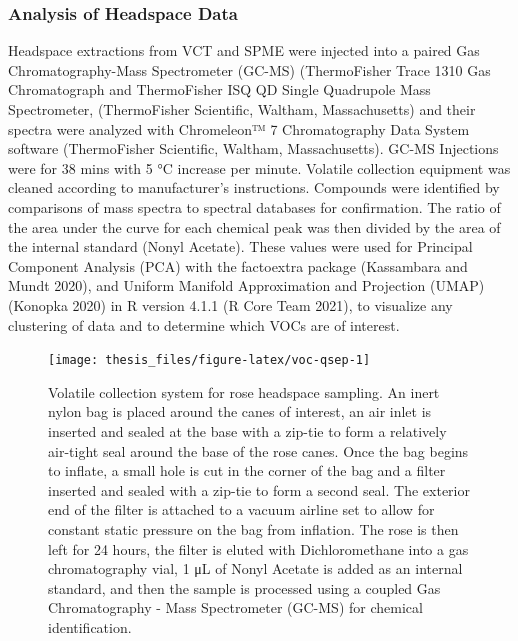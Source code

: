 \documentclass[12pt,final,CPage]{ufthesis}
\begin{document}
{  \hypertarget{mm-voc-analyze}{%
  \subsubsection{Analysis of Headspace Data}\label{mm-voc-analyze}}

  Headspace extractions from VCT and SPME were injected into a paired Gas Chromatography-Mass Spectrometer (GC-MS) (ThermoFisher Trace 1310 Gas Chromatograph and ThermoFisher ISQ QD Single Quadrupole Mass Spectrometer, (ThermoFisher Scientific, Waltham, Massachusetts) and their spectra were analyzed with Chromeleon™ 7 Chromatography Data System software (ThermoFisher Scientific, Waltham, Massachusetts). GC-MS Injections were for 38 mins with 5 °C increase per minute. Volatile collection equipment was cleaned according to manufacturer's instructions. Compounds were identified by comparisons of mass spectra to spectral databases for confirmation. The ratio of the area under the curve for each chemical peak was then divided by the area of the internal standard (Nonyl Acetate). These values were used for Principal Component Analysis (PCA) with the factoextra package (Kassambara and Mundt 2020), and Uniform Manifold Approximation and Projection (UMAP) (Konopka 2020) in R version 4.1.1 (R Core Team 2021), to visualize any clustering of data and to determine which VOCs are of interest.
  \begin{figure}

  {\centering \texttt{[image: thesis\_files/figure-latex/voc-qsep-1]} 

  }

  \caption{Volatile collection system for rose headspace sampling. An inert nylon bag is placed around the canes of interest, an air inlet is inserted and sealed at the base with a zip-tie to form a relatively air-tight seal around the base of the rose canes. Once the bag begins to inflate, a small hole is cut in the corner of the bag and a filter inserted and sealed with a zip-tie to form a second seal. The exterior end of the filter is attached to a vacuum airline set to allow for constant static pressure on the bag from inflation. The rose is then left for 24 hours, the filter is eluted with Dichloromethane into a gas chromatography vial, 1 \si{\micro\liter} of Nonyl Acetate is added as an internal standard, and then the sample is processed using a coupled Gas Chromatography - Mass Spectrometer (GC-MS) for chemical identification.}\label{fig:voc-qsep}
  \end{figure}
  \begin{figure}


\end{figure}}
\end{document}
